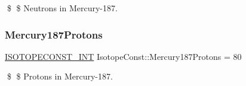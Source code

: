 \$ \$ Neutrons in Mercury-\/187. \mbox{\label{group___isotope_const-_mercury-_hg187_gac385d06fb2cbb2e9d0995c0e034516f6}} 
\subsubsection{\texorpdfstring{Mercury187\+Protons}{Mercury187Protons}}
{\footnotesize\ttfamily \mbox{\hyperlink{group___isotope_const-_macros_ga5f18360b3e99483a35c32d789e62621c}{I\+S\+O\+T\+O\+P\+E\+C\+O\+N\+S\+T\+\_\+\+I\+NT}} Isotope\+Const\+::\+Mercury187\+Protons = 80}

\$ \$ Protons in Mercury-\/187. 